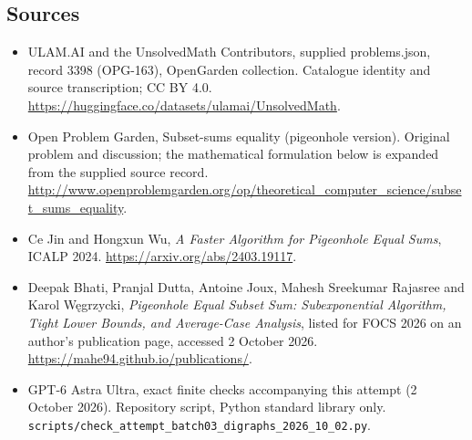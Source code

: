 \documentclass[11pt,a4paper]{article}
\begin{document}
\subsection{Sources}
\begin{itemize}
\item[S1] ULAM.AI and the UnsolvedMath Contributors, supplied problems.json, record 3398 (OPG-163), OpenGarden collection. Catalogue identity and source transcription; CC BY 4.0.
\url{https://huggingface.co/datasets/ulamai/UnsolvedMath}.
\item[S2] Open Problem Garden, Subset-sums equality (pigeonhole version). Original problem and discussion; the mathematical formulation below is expanded from the supplied source record.
\url{http://www.openproblemgarden.org/op/theoretical_computer_science/subset_sums_equality}.
\item[S3] Ce Jin and Hongxun Wu, \emph{A Faster Algorithm for Pigeonhole Equal Sums}, ICALP 2024. \url{https://arxiv.org/abs/2403.19117}.
\item[S4] Deepak Bhati, Pranjal Dutta, Antoine Joux, Mahesh Sreekumar Rajasree and Karol W\k egrzycki, \emph{Pigeonhole Equal Subset Sum: Subexponential Algorithm, Tight Lower Bounds, and Average-Case Analysis}, listed for FOCS 2026 on an author's publication page, accessed 2 October 2026. \url{https://mahe94.github.io/publications/}.
\item[S9] GPT-6 Astra Ultra, exact finite checks accompanying this attempt (2 October 2026). Repository script, Python standard library only. \texttt{scripts/check\_attempt\_batch03\_digraphs\_2026\_10\_02.py}.
\end{itemize}
\end{document}
